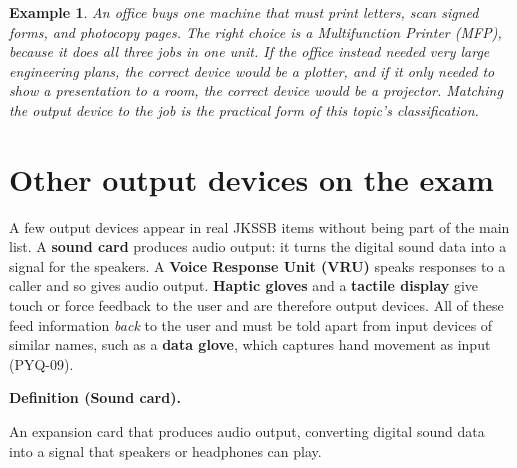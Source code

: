 \documentclass[11pt]{article}
\newtheorem{example}{Example}[section]
\newenvironment{definitionbox}[1]{%
  \par\noindent\textbf{Definition (#1).}\ \itshape
}{\par\vspace{0.3em}}
\begin{document}
\begin{example}
An office buys one machine that must print letters, scan signed forms, and
photocopy pages. The right choice is a Multifunction Printer (MFP), because it
does all three jobs in one unit. If the office instead needed very large
engineering plans, the correct device would be a plotter, and if it only
needed to show a presentation to a room, the correct device would be a
projector. Matching the output device to the job is the practical form of this
topic's classification.
\end{example}

\section{Other output devices on the exam}
A few output devices appear in real JKSSB items without being part of the
main list. A \textbf{sound card} produces audio output: it turns the digital
sound data into a signal for the speakers. A \textbf{Voice Response Unit
(VRU)} speaks responses to a caller and so gives audio output. \textbf{Haptic
gloves} and a \textbf{tactile display} give touch or force feedback to the
user and are therefore output devices. All of these feed information
\emph{back} to the user and must be told apart from input devices of similar
names, such as a \textbf{data glove}, which captures hand movement as input
(PYQ-09).

\begin{definitionbox}{Sound card}
An expansion card that produces audio output, converting digital sound data
into a signal that speakers or headphones can play.
\end{definitionbox}
\end{document}
